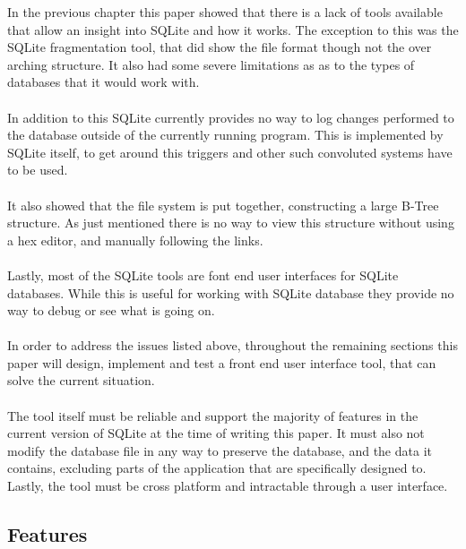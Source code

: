In the previous chapter this paper showed that there is a lack of tools available that allow an insight into SQLite and how it works. The exception to this was the SQLite fragmentation tool, that did show the file format though not the over arching structure. It also had some severe limitations as as to the types of databases that it would work with. 
\\\\
In addition to this SQLite currently provides no way to log changes performed to the database outside of the currently running program. This is implemented by SQLite itself, to get around this triggers and other such convoluted systems have to be used.
\\\\
It also showed that the file system is put together, constructing a large B-Tree structure. As just mentioned there is no way to view this structure without using a hex editor, and manually following the links.
\\\\
Lastly, most of the SQLite tools are font end user interfaces for SQLite databases. While this is useful for working with SQLite database they provide no way to debug or see what is going on. 
\\\\
In order to address the issues listed above, throughout the remaining sections this paper will design, implement and test a front end user interface tool, that can solve the current situation.
\\\\
The tool itself must be reliable and support the majority of features in the current version of SQLite at the time of writing this paper. It must also not modify the database file in any way to preserve the database, and the data it contains, excluding parts of the application that are specifically designed to. Lastly, the tool must be cross platform and intractable through a user interface. 

\subsection{Features}
\label{subsec:Features}

